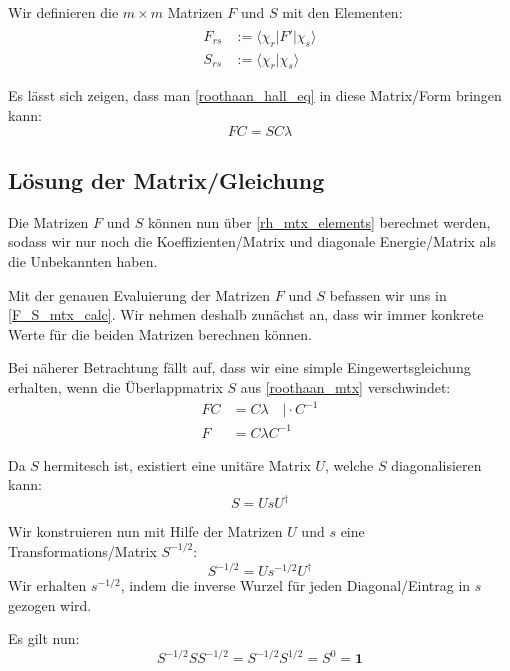 Wir definieren die $m\times m$ Matrizen $F$ und $S$ mit den Elementen:
\begin{equation}\label{rh_mtx_elements}
  \begin{aligned}
    F_{r s} &:= \langle \chi_r \vert \hat{F}' \vert \chi_s \rangle\\
    S_{r s} &:= \langle \chi_r \vert \chi_s \rangle
  \end{aligned}
\end{equation}

Es lässt sich zeigen, dass man \cref*{roothaan_hall_eq} in diese Matrix\-/Form bringen kann:
\begin{equation} \label{roothaan_mtx}
  FC = SC\lambda
\end{equation}

\subsection{Lösung der Matrix\-/Gleichung}
Die Matrizen $F$ und $S$ können nun über \cref{rh_mtx_elements} berechnet werden,
sodass wir nur noch die Koeffizienten\-/Matrix und diagonale Energie\-/Matrix als die Unbekannten haben.

Mit der genauen Evaluierung der Matrizen $F$ und 
$S$ befassen wir uns in \cref{F_S_mtx_calc}.
Wir nehmen deshalb zunächst an,
dass wir immer konkrete Werte für die beiden Matrizen berechnen können.

Bei näherer Betrachtung fällt auf, dass wir eine simple Eingewertsgleichung erhalten,
wenn die Überlappmatrix $S$ aus \cref{roothaan_mtx} verschwindet:
\begin{align*}
    FC &= C\lambda \quad \vert \cdot C^{-1}\\
    F &= C\lambda C^{-1}
\end{align*}

Da $S$ hermitesch ist, existiert eine unitäre Matrix $U$, welche $S$ diagonalisieren kann:
\begin{equation}
    S = U s U^\dagger
\end{equation}

Wir konstruieren nun mit Hilfe der Matrizen $U$ und $s$ eine Transformations\-/Matrix $S^{-1/2}$:
\begin{equation}
    S^{-1/2} = U s^{-1/2} U^\dagger
\end{equation}
Wir erhalten $s^{-1/2}$, indem die inverse Wurzel für jeden Diagonal\-/Eintrag in $s$ gezogen wird.

Es gilt nun:
\begin{equation}
    S^{-1/2} S S^{-1/2} = S^{-1/2} S^{1/2} = S^{0} = \mathbf{1}
\end{equation}

